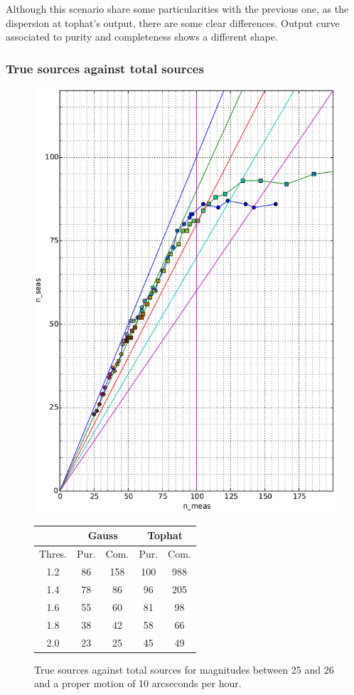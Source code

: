 \documentclass{article}
\begin{document}
Although this scenario share some particularities with the previous one, as the dispersion at tophat's output, there are some clear differences. Output curve associated to purity and completeness shows a different shape.

\subsubsection{True sources against total sources}
\begin{figure}[H]
\centering
\includegraphics[width=.55\linewidth]{images/25_26_10_d.eps}
\qquad
\begin{tabular}[b]{|c|c|c|c|c|}\hline
\multicolumn{1}{|c|}{} & \multicolumn{2}{c|}{Gauss} & \multicolumn{2}{c|}{Tophat} \\
\hline \hline
Thres. & Pur. & Com. & Pur. & Com.\\
\hline
1.2 & 86 & 158 & 100 & 988\\
\hline
1.4 & 78 & 86 & 96 & 205\\
\hline
1.6 & 55 & 60 & 81 & 98\\
\hline
1.8 & 38 & 42 & 58 & 66\\
\hline
2.0 & 23 & 25 & 45 & 49\\
\hline
\end{tabular}
\captionsetup{labelformat=andtable}
\caption{True sources against total sources for magnitudes between 25 and 26 and a proper motion of 10 arcseconds per hour.}
\end{figure}
\end{document}
